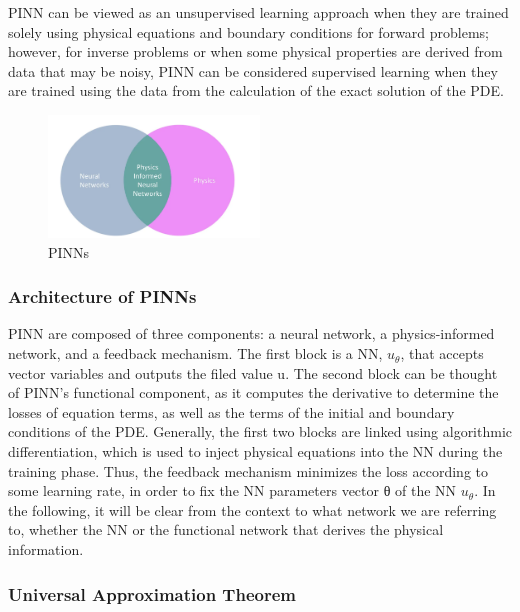 \documentclass{article}
\begin{document}
PINN can be viewed as an unsupervised learning approach when they are trained solely using physical equations and boundary conditions for forward problems; however, for inverse problems or when some physical properties are derived from data that may be noisy, PINN can be considered supervised learning when they are trained using the data from the calculation of the exact solution of the PDE.
\begin{figure}[H]
    \centering
    \includegraphics[width=0.5\textwidth]{images/pinns}
    \caption{PINNs}
\end{figure}

\subsubsection{Architecture of PINNs}

PINN are composed of three components: a neural network, a physics-informed network, and a feedback mechanism. The first block is a NN, $u_θ$,
that accepts vector variables  and outputs the filed value u. The second block can be thought of PINN’s functional component, as it computes the derivative to determine the losses of equation terms,
as well as the terms of the initial and boundary conditions of the PDE. Generally, the first two blocks are linked using algorithmic differentiation, which is used to inject physical equations into 
the NN during the training phase. Thus, the feedback mechanism minimizes the loss according to some learning rate, in order to fix the NN parameters vector θ of the NN $u_θ$.
In the following, it will be clear from the context to what network we are referring to, whether the NN or the functional network that derives the physical information.



\subsubsection{Universal Approximation Theorem}
\end{document}
